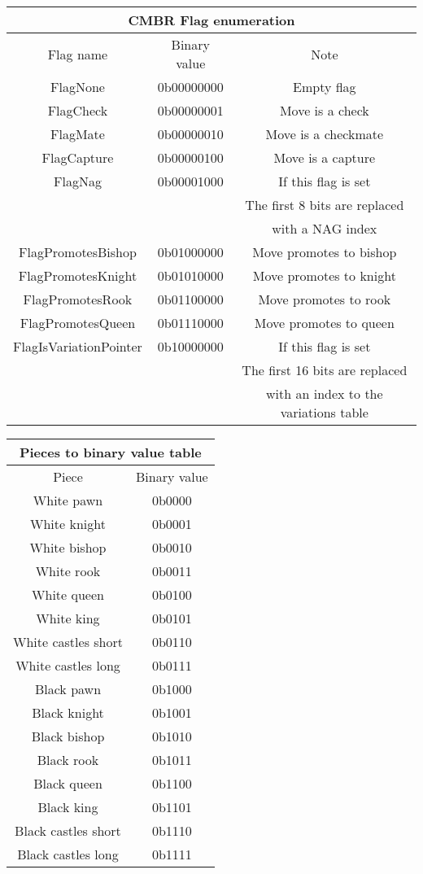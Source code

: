\documentclass{article}
\begin{document}
\begin{center}
\begin{tabular}{|c|c|c|}
 \hline
 \multicolumn{3}{|c|}{CMBR Flag enumeration} \\
 \hline
 Flag name & Binary value & Note \\
 \hline
 FlagNone & 0b00000000 & Empty flag \\
 \hline
 FlagCheck & 0b00000001 & Move is a check \\
 \hline
 FlagMate & 0b00000010 & Move is a checkmate \\
 \hline
 FlagCapture & 0b00000100 & Move is a capture \\
 \hline
 FlagNag & 0b00001000 & If this flag is set \\
  & & The first 8 bits are replaced \\
  & & with a NAG index \\
 \hline
 FlagPromotesBishop & 0b01000000 & Move promotes to bishop \\
 \hline
 FlagPromotesKnight & 0b01010000 & Move promotes to knight \\
 \hline
 FlagPromotesRook & 0b01100000 & Move promotes to rook \\
 \hline
 FlagPromotesQueen & 0b01110000 & Move promotes to queen \\
 \hline
 FlagIsVariationPointer & 0b10000000 & If this flag is set \\
 & & The first 16 bits are replaced \\
 & & with an index to the variations table \\
 \hline
\end{tabular}
\end{center}

\begin{center}
\begin{tabular}{ |c|c| }
 \hline
 \multicolumn{2}{|c|}{Pieces to binary value table} \\
 \hline
 Piece & Binary value \\
 \hline
 White pawn & 0b0000 \\
 \hline
 White knight & 0b0001 \\
 \hline
 White bishop & 0b0010 \\
 \hline
 White rook & 0b0011 \\
 \hline
 White queen & 0b0100 \\
 \hline
 White king & 0b0101 \\
 \hline
 White castles short & 0b0110 \\
 \hline
 White castles long & 0b0111 \\
 \hline
 Black pawn & 0b1000 \\
 \hline
 Black knight & 0b1001 \\
 \hline
 Black bishop & 0b1010 \\
 \hline
 Black rook & 0b1011 \\
 \hline
 Black queen & 0b1100 \\
 \hline
 Black king & 0b1101 \\
 \hline
 Black castles short & 0b1110 \\
 \hline
 Black castles long & 0b1111 \\
 \hline
\end{tabular}
\end{center}
\end{document}
